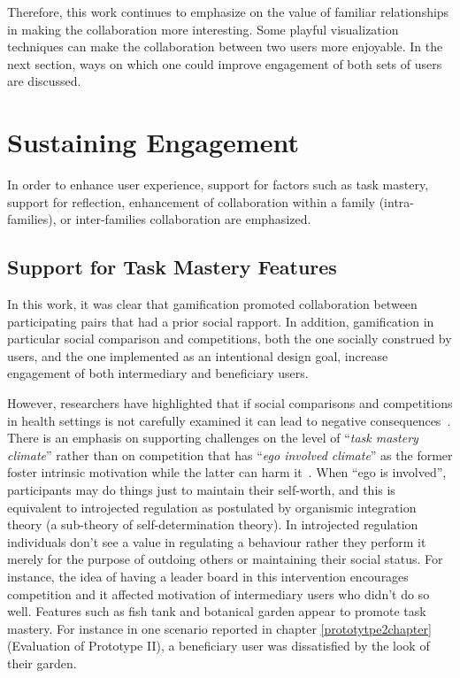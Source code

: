 Therefore, this work continues to emphasize on the value of familiar relationships in making the collaboration more interesting. Some playful visualization techniques can make the collaboration between two users more enjoyable. In the next section, ways on which one could improve engagement of both sets of users are discussed.

\section{Sustaining Engagement}
In order to enhance user experience, support for factors such as task mastery, support for reflection, enhancement of collaboration within a family (intra-families), or inter-families collaboration are emphasized.
\subsection{Support for Task Mastery Features}
In this work, it was clear that gamification promoted collaboration between participating pairs that had a prior social rapport. In addition, gamification in particular social comparison and competitions, both the one socially construed by users, and the one implemented as an intentional design goal,   increase engagement of both intermediary and beneficiary users.

However, researchers have highlighted that if social comparisons and competitions in health settings is not carefully examined it can lead to negative consequences~\citep{grimes2009toward}. There is an emphasis on supporting challenges on the level of ``\emph{task mastery climate}'' rather than on competition that has ``\emph{ego involved climate}'' as the  former foster intrinsic motivation while the latter can harm it~\citep{saksono2015spaceship}. When ``ego is involved'', participants may do things just to maintain their self-worth, and this is equivalent to introjected regulation as postulated by organismic integration theory (a sub-theory of self-determination theory)\citep{ryan2000:self}. In introjected regulation individuals don't see a value in regulating a behaviour rather they perform it merely for the purpose of outdoing others or maintaining their social status. For instance, the idea of having a leader board in this intervention encourages competition and it affected motivation of intermediary users who didn't do so well. Features such as fish tank and botanical garden appear to promote task mastery. For instance in one scenario reported in chapter \ref{prototytpe2chapter} (Evaluation of Prototype II),  a beneficiary user was dissatisfied by the look of their garden.

